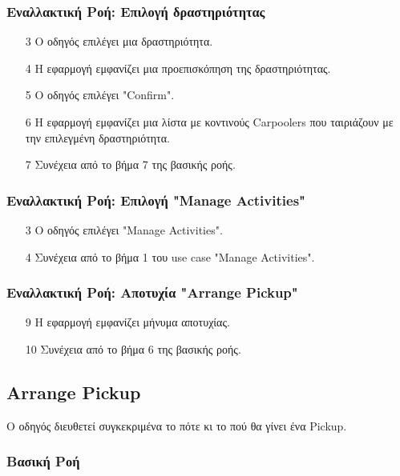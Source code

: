 \subsubsection{Εναλλακτική Ροή: Επιλογή δραστηριότητας}

\begin{enumerate}
    \item[3] Ο οδηγός επιλέγει μια δραστηριότητα.
    \item[4] Η εφαρμογή εμφανίζει μια προεπισκόπηση της δραστηριότητας.
    \item[5] Ο οδηγός επιλέγει "Confirm".
    \item[6] Η εφαρμογή εμφανίζει μια λίστα με κοντινούς Carpoolers που ταιριάζουν με την
        επιλεγμένη δραστηριότητα.
    \item[7] Συνέχεια από το βήμα 7 της βασικής ροής.
\end{enumerate}

\subsubsection{Εναλλακτική Ροή: Επιλογή "Manage Activities"}

\begin{enumerate}
    \item[3] Ο οδηγός επιλέγει "Manage Activities".
    \item[4] Συνέχεια από το βήμα 1 του use case "Manage Activities".
\end{enumerate}

\subsubsection{Εναλλακτική Ροή: Αποτυχία "Arrange Pickup"}

\begin{enumerate}
    \item[9] Η εφαρμογή εμφανίζει μήνυμα αποτυχίας.
    \item[10] Συνέχεια από το βήμα 6 της βασικής ροής.
\end{enumerate}

\newpage

\subsection{Arrange Pickup}

Ο οδηγός διευθετεί συγκεκριμένα το πότε κι το πού θα γίνει ένα Pickup.

\subsubsection{Βασική Ροή}


